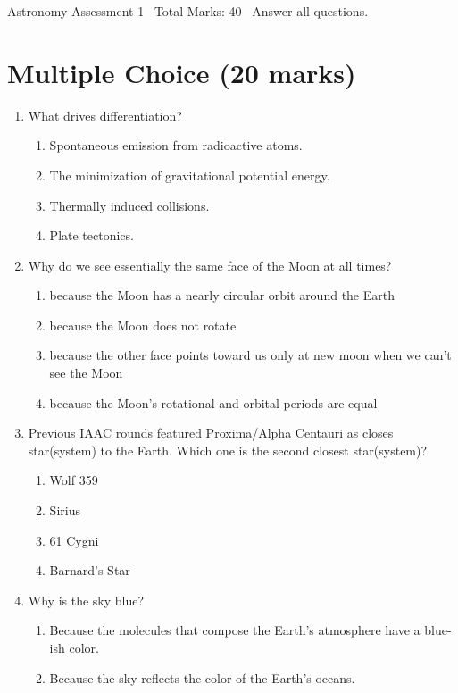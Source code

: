 \documentclass[12pt]{article}
\begin{document}
\begin{center}
Astronomy Assessment 1 \
Total Marks: 40 \
Answer all questions.
\end{center}

\section*{Multiple Choice (20 marks)}
\begin{enumerate}[label=\arabic*.]
\item What drives differentiation?
\begin{enumerate}[label=(\alph*)]
    \item Spontaneous emission from radioactive atoms.
    \item The minimization of gravitational potential energy.
    \item Thermally induced collisions.
    \item Plate tectonics.
\end{enumerate}
\item Why do we see essentially the same face of the Moon at all times?
\begin{enumerate}[label=(\alph*)]
    \item because the Moon has a nearly circular orbit around the Earth
    \item because the Moon does not rotate
    \item because the other face points toward us only at new moon when we can't see the Moon
    \item because the Moon's rotational and orbital periods are equal
\end{enumerate}
\item Previous IAAC rounds featured Proxima/Alpha Centauri as closes star(system) to the Earth. Which one is the second closest star(system)?
\begin{enumerate}[label=(\alph*)]
    \item Wolf 359
    \item Sirius
    \item 61 Cygni
    \item Barnard's Star
\end{enumerate}
\item Why is the sky blue?
\begin{enumerate}[label=(\alph*)]
    \item Because the molecules that compose the Earth's atmosphere have a blue-ish color.
    \item Because the sky reflects the color of the Earth's oceans.

\end{enumerate}
\end{enumerate}
\end{document}
